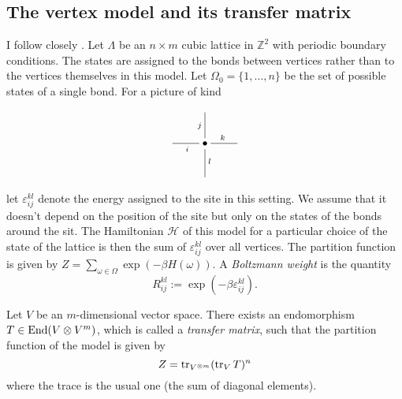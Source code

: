\subsection{The vertex model and its transfer matrix}
I follow closely \cite{chari}. Let $\Lambda$ be an $n \times m$ cubic lattice in $\mathbb Z^2$ with periodic boundary conditions. The states are assigned to the bonds between vertices rather than to the vertices themselves in this model. Let $\Omega_0 = \{1,\ldots,n\}$ be the set of possible states of a single bond. For a picture of kind
\[
\xymatrix{
& &\\
& \bullet \ar@{-}[r]^{k} \ar@{-}[d]^{l} \ar@{-}[u]^{j} \ar@{-}[l]^{i} &\\
& &
}
\]
let $\varepsilon_{ij}^{kl}$ denote the energy assigned to the site in this setting. We assume that it doesn't depend on the position of the site but only on the states of the bonds around the sit. The Hamiltonian $\mathcal H$ of this model for a particular choice of the state of the lattice is then the sum of $\varepsilon_{ij}^{kl}$ over all vertices. The partition function is given by $Z = \sum_{\omega \in \Omega} \exp(-\beta H(\omega))$. A \emph{Boltzmann weight} is the quantity
\[
R_{ij}^{kl} := \exp(-\beta \varepsilon_{ij}^{kl}).
\]
\begin{proposition}
Let $V$ be an $m$-dimensional vector space. There exists an endomorphism $T \in \operatorname{End}(V \otimes V^{m})$, which is called a \emph{transfer matrix}, such that the partition function of the model is given by
\[
Z = \operatorname{tr}_{V^{\otimes m}} (\operatorname{tr}_{V} T)^{n}
\]
where the trace is the usual one (the sum of diagonal elements).
\end{proposition}
